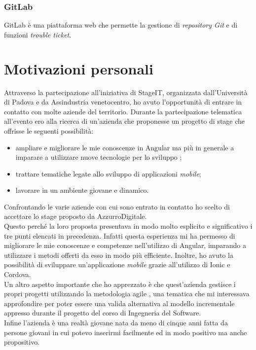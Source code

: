 \subsubsection{GitLab}
GitLab è una piattaforma web  che permette la gestione di \emph{repository Git} e di funzioni \emph{trouble ticket}.

\section{Motivazioni personali}
Attraverso la partecipazione all'iniziativa di StageIT, organizzata dall'Università di Padova e da Assindustria venetocentro, ho avuto l'opportunità di entrare in contatto con molte aziende del territorio.
Durante la partecipazione telematica all'evento ero alla ricerca di un’azienda che proponesse un progetto di stage che offrisse le seguenti possibilità:

\begin{itemize}
	\item ampliare e migliorare le mie conoscenze in Angular ma più in generale a imparare a utilizzare nuove tecnologie per lo sviluppo ;
	\item trattare tematiche legate allo sviluppo di applicazioni \emph{mobile};
	\item lavorare in un ambiente giovane e dinamico.
\end{itemize}  

Confrontando le varie aziende con cui sono entrato in contatto ho scelto di accettare lo stage proposto da AzzurroDigitale. \\

Questo perché la loro proposta presentava in modo molto esplicito e significativo i tre punti elencati in precedenza.
Infatti questa esperienza mi ha permesso di migliorare le mie conoscenze e competenze nell’utilizzo di Angular, imparando a utilizzare i metodi offerti da esso in modo più efficiente. Inoltre, ho avuto la possibilità di sviluppare un’applicazione \emph{mobile} grazie all'utilizzo di Ionic e Cordova. \\
Un altro aspetto importante che ho apprezzato è che quest'azienda gestisce i propri progetti utilizzando la metodologia agile , una tematica che mi interessava approfondire per poter essere una valida alternativa al modello incrementale appresso durante il progetto del corso di Ingegneria del Software.
\\Infine l'azienda è una realtà giovane nata da meno di cinque anni fatta da persone giovani in cui potevo inserirmi facilmente ed in modo positivo ma anche propositivo.
